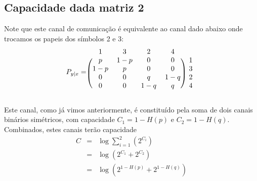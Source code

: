 \subsection{Capacidade dada matriz 2}

\begin{questions}

\begin{solution}
Note que este canal de comunicação é equivalente ao canal dado abaixo
onde trocamos os papeis dos símbolos 2 e 3:
\begin{equation}
  P_{y \vert x} = 
\begin{blockarray}{ccccc}
 1 & 3 & 2 & 4 \\
\begin{block}{(cccc)c}
  p   & 1-p & 0   & 0   & 1 \\
  1-p & p   & 0   & 0   & 3 \\
  0   & 0   & q   & 1-q & 2 \\
  0   & 0   & 1-q & q   & 4 \\
\end{block}
\end{blockarray}
\end{equation}

Este canal, como já vimos anteriormente, é constituído pela soma de dois canais
binários simétricos, com capacidade $C_1 = 1 - H(p)$ e $C_2 = 1 - H(q)$.
Combinados, estes canais terão capacidade
\begin{eqnarray}
C &=& \log \sum_{i=1}^{2} \left( 2^{C_i} \right)  \nonumber \\
        &=& \log \left( 2^{C_1} + 2^{C_2} \right) \nonumber \\
        &=& \log \left( 2^{1 - H(p)} + 2^{1 - H(q)} \right)
\end{eqnarray}

\end{solution}
\end{questions}
